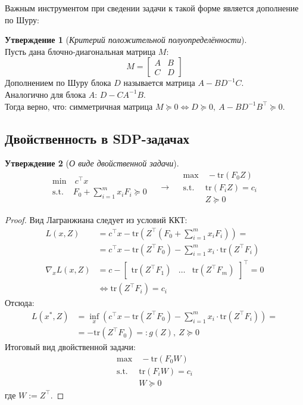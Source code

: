 \documentclass[11pt,a4paper]{report}
\def \tr{\mbox{tr}}
\theoremstyle{definition}
\theoremstyle{definition}
\newtheorem{statement}{Утверждение}[section]
\theoremstyle{definition}
\begin{document}
	Важным инструментом при сведении задачи к такой форме является дополнение по Шуру:
	\begin{statement}[\textit{Критерий положительной полуопределённости}]$  $\\
		Пусть дана блочно-диагональная матрица $M$:
		$$
			M = \begin{bmatrix} 
				A & B\\ C & D
			\end{bmatrix}
		$$
		Дополнением по Шуру блока $ D $ называется матрица $ A - BD^{-1}C $.\\
		Аналогично для блока $ A $: $ D - CA^{-1}B $.\\
		Тогда верно, что: симметричная матрица $ M \succeq 0 \iff D \succeq 0,\ A - BD^{-1}B^{\top} \succeq 0$.
	\end{statement}
	\subsection{Двойственность в SDP-задачах}
	\begin{statement}[\textit{О виде двойственной задачи}]
		$$
			\begin{aligned}
				\min&\ c^{\top} x\\
				\text{s.t. }& F_0 + \sum_{i=1}^{m} x_i F_i \succeq 0
			\end{aligned} \quad\longrightarrow\quad 
			\begin{aligned}
				\max&\ -\tr (F_0 Z)\\
				\text{s.t. }& \tr (F_i Z) = c_i\\
				& Z \succeq 0 
			\end{aligned}
		$$
	\end{statement}
	\begin{proof}
		Вид Лагранжиана следует из условий ККТ:
		\begin{align*}
			L(x, Z) &= c^\top x - \tr\left (Z^{\top}\left (F_0 + \sum_{i=1}^{m} x_i F_i \right )\right ) =\\
			&= c^\top x - \tr (Z^\top F_0) - \sum_{i=1}^{m} x_i \cdot \tr\left (Z^{\top} F_i \right ) \\
			\nabla_{x} L(x, Z) &= c - \begin{bmatrix}
				\tr\left (Z^{\top} F_1 \right ) &
				\ldots &
				\tr\left (Z^{\top} F_m \right )
			\end{bmatrix}^{\top} = 0 \\&\iff \tr\left (Z^{\top} F_i \right ) = c_i
		\end{align*}
		Отсюда:
		\begin{align*}
			L(x^*, Z) &= \inf\limits_{x} \left (c^\top x - \tr (Z^\top F_0) - \sum_{i=1}^{m} x_i \cdot \tr\left (Z^{\top} F_i \right )\right ) =\\
			&= - \tr (Z^\top F_0) =: g(Z),\ Z \succeq 0
		\end{align*}
		Итоговый вид двойственной задачи: 
		$$
			\begin{aligned}
				\max&\ -\tr (F_0 W)\\
				\text{s.t. }& \tr (F_i W) = c_i\\
				& W \succeq 0 
			\end{aligned}
		$$
		где $ W := Z^\top $. 
	\end{proof}
\end{document}
